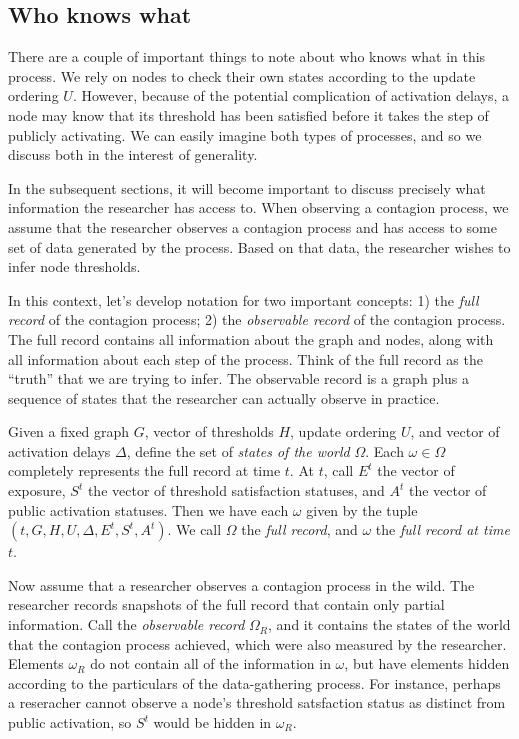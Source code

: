 \documentclass[a4paper]{article}
\begin{document}
\subsection{Who knows what}

There are a couple of important things to note about who knows what in this process. We rely on nodes to check their own states according to the update ordering $U$. However, because of the potential complication of activation delays, a node may know that its threshold has been satisfied before it takes the step of publicly activating. We can easily imagine both types of processes, and so we discuss both in the interest of generality.

In the subsequent sections, it will become important to discuss precisely what information the researcher has access to. When observing a contagion process, we assume that the researcher observes a contagion process and has access to some set of data generated by the process. Based on that data, the researcher wishes to infer node thresholds.

In this context, let's develop notation for two important concepts: 1) the \emph{full record} of the contagion process; 2) the \emph{observable record} of the contagion process. The full record contains all information about the graph and nodes, along with all information about each step of the process. Think of the full record as the ``truth'' that we are trying to infer. The observable record is a graph plus a sequence of states that the researcher can actually observe in practice.

Given a fixed graph $G$, vector of thresholds $H$, update ordering $U$, and vector of activation delays $\Delta$, define the set of \emph{states of the world} $\Omega$. Each $\omega \in \Omega$ completely represents the full record at time $t$. At $t$, call $E^t$ the vector of exposure, $S^t$ the vector of threshold satisfaction statuses, and $A^t$ the vector of public activation statuses. Then we have each $\omega$ given by the tuple $(t, G, H, U, \Delta, E^t, S^t, A^t)$. We call $\Omega$ the \emph{full record}, and $\omega$ the \emph{full record at time $t$}.

Now assume that a researcher observes a contagion process in the wild. The researcher records snapshots of the full record that contain only partial information. Call the \emph{observable record} $\Omega_R$, and it contains the states of the world that the contagion process achieved, which were also measured by the researcher. Elements $\omega_R$ do not contain all of the information in $\omega$, but have elements hidden according to the particulars of the data-gathering process. For instance, perhaps a reseracher cannot observe a node's threshold satsfaction status as distinct from public activation, so $S^t$ would be hidden in $\omega_R$.
\end{document}
